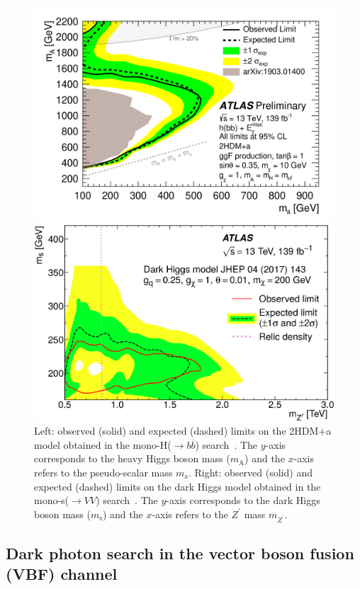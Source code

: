 \documentclass{moriond}
\begin{document}
\begin{figure} [htb]
\begin{minipage}{0.45\linewidth}
\centerline{\includegraphics[width=0.8\linewidth]{monoh}}
\end{minipage}
\begin{minipage}{0.45\linewidth}
\centerline{\includegraphics[width=0.8\linewidth]{monos}}
\end{minipage}
\caption[]{Left: observed (solid) and expected (dashed) limits on the 2HDM+a model obtained in the mono-H($\rightarrow b\overline{b}$) search~\cite{monoh}. The $y$-axis corresponds to the heavy Higgs boson mass ($m_{\mathrm{A}}$) and the $x$-axis refers to the pseudo-scalar mass $m_{\mathrm{a}}$. Right: observed (solid) and expected (dashed) limits on the dark Higgs model obtained in the mono-s($\rightarrow VV$) search~\cite{monos}. The $y$-axis corresponds to the dark Higgs boson mass ($m_{\mathrm{s}}$) and the $x$-axis refers to the $Z^{\prime}$ mass $m_{Z^{\prime}}$.}
\label{fig:mono_h_s}
\end{figure}

\subsection{Dark photon search in the vector boson fusion (VBF) channel}
\end{document}
